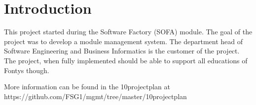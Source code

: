 \chapter{Introduction}

This project started during the Software Factory (SOFA) module. The goal of the project was to develop a module management system.
The department head of Software Engineering and Business Informatics is the customer of the project. The project, when fully implemented should be able to support all educations of Fontys though.

More information can be found in the 10projectplan at https://github.com/FSG1/mgmt/tree/master/10projectplan